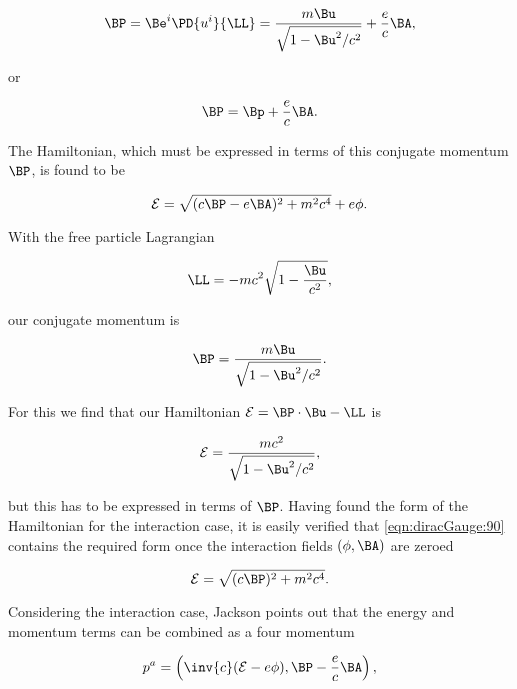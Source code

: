 \begin{equation}\label{eqn:diracGauge:50}
\BP = \Be^i \PD{u^i}{\LL} = \frac{m \Bu}{\sqrt{1 - \Bu^2/c^2}} + \frac{e}{c} \BA,
\end{equation}

or

\begin{equation}\label{eqn:diracGauge:70}
\BP = \Bp + \frac{e}{c} \BA.
\end{equation}

The Hamiltonian, which must be expressed in terms of this conjugate momentum $\BP$, is found to be

\begin{equation}\label{eqn:diracGauge:90}
\mathcal{E} = \sqrt{ (c \BP - e \BA)^2 + m^2 c^4 } + e \phi.
\end{equation}

With the free particle Lagrangian

\begin{equation}\label{eqn:diracGauge:110}
\LL = -m c^2 \sqrt{ 1 - \frac{\Bu}{c^2}} ,
\end{equation}

our conjugate momentum is

\begin{equation}\label{eqn:diracGauge:130}
\BP = \frac{m \Bu}{\sqrt{ 1 - \Bu^2/c^2} }.
\end{equation}

For this we find that our Hamiltonian $\mathcal{E} = \BP \cdot \Bu - \LL$ is

\begin{equation}\label{eqn:diracGauge:150}
\mathcal{E} = \frac{m c^2}{\sqrt{1 - \Bu^2/c^2}},
\end{equation}

but this has to be expressed in terms of $\BP$.  Having found the form of the Hamiltonian for the interaction case, it is easily verified that \ref{eqn:diracGauge:90} contains the required form once the interaction fields $(\phi, \BA)$ are zeroed

\begin{equation}\label{eqn:diracGauge:90b}
\mathcal{E} = \sqrt{ (c \BP)^2 + m^2 c^4 }.
\end{equation}

Considering the interaction case, Jackson points out that the energy and momentum terms can be combined as a four momentum

\begin{equation}\label{eqn:diracGauge:170}
p^a = \left( \inv{c}(\mathcal{E} - e \phi), \BP - \frac{e}{c}\BA \right),
\end{equation}

